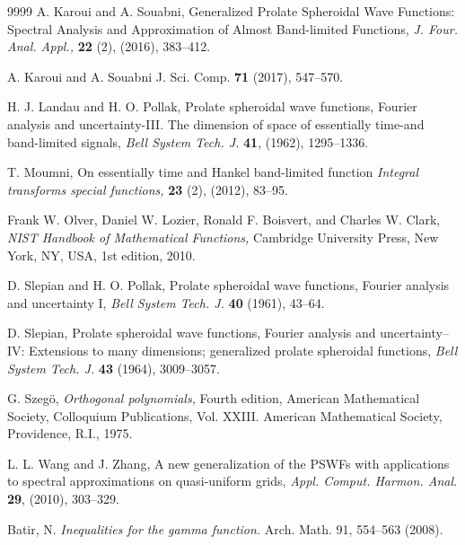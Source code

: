 \documentclass[]{article}
\begin{document}
\begin{thebibliography}{9999}
 A. Karoui and A. Souabni, Generalized Prolate Spheroidal Wave Functions: Spectral Analysis  and Approximation of Almost Band-limited Functions, {\it J.  Four.  Anal. Appl.,} {\bf 22} (2), (2016), 383--412.

 A. Karoui and  A. Souabni
J. Sci. Comp. {\bf 71} (2017), 547--570.



 H. J. Landau and H. O. Pollak, Prolate spheroidal  wave functions, Fourier analysis and
uncertainty-III. The dimension of space of essentially time-and
band-limited signals, {\it Bell System Tech. J.} {\bf 41}, (1962),
1295--1336.

 T. Moumni, On essentially time and Hankel band-limited function {\it Integral transforms special functions,} {\bf 23} (2), (2012), 83--95.


 Frank W. Olver, Daniel W. Lozier, Ronald F. Boisvert, and Charles W.
Clark, {\it NIST Handbook of Mathematical Functions,}  Cambridge University
Press, New York, NY, USA, 1st edition, 2010.



 D. Slepian and H. O. Pollak, Prolate spheroidal wave functions, Fourier analysis and
uncertainty I, {\it Bell System Tech. J.} {\bf 40} (1961), 43--64.

 D. Slepian,  Prolate spheroidal wave functions, Fourier analysis and
uncertainty--IV: Extensions to many dimensions; generalized
prolate spheroidal functions, {\it Bell System Tech. J.} {\bf 43}
(1964), 3009--3057.

 G.  Szeg\"o,  {\it  Orthogonal polynomials,} Fourth edition, American Mathematical Society,
Colloquium Publications, Vol. XXIII. American Mathematical Society, Providence, R.I., 1975.


  L. L. Wang and J. Zhang, A new generalization of the PSWFs with applications to spectral
 approximations on quasi-uniform grids, {\it Appl. Comput. Harmon. Anal.}
 {\bf 29},  (2010), 303--329.


 Batir, N. {\it Inequalities for the gamma function.} Arch. Math. 91, 554--563 (2008).


\end{thebibliography}
\end{document}
